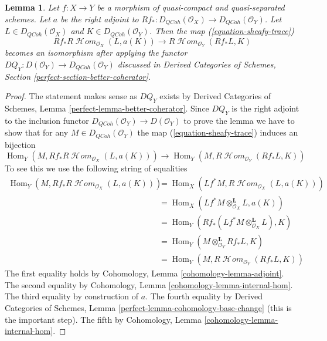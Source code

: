 \documentclass[10pt,a4paper]{amsart}
\theoremstyle{plain}
\newtheorem{lemma}[subsection]{Lemma}
\theoremstyle{definition}
\theoremstyle{remark}
\numberwithin{equation}{subsection}
\def\Hom{\mathop{\mathrm{Hom}}\nolimits}
\def\SheafHom{\mathop{\mathcal{H}\!\mathit{om}}\nolimits}
\def\QCoh{\mathit{QCoh}}
\begin{document}
\begin{lemma}
\label{lemma-iso-on-RSheafHom}
Let $f : X \to Y$ be a morphism of quasi-compact and quasi-separated schemes.
Let $a$ be the right adjoint to
$Rf_* : D_\QCoh(\mathcal{O}_X) \to D_\QCoh(\mathcal{O}_Y)$.
Let $L \in D_\QCoh(\mathcal{O}_X)$ and $K \in D_\QCoh(\mathcal{O}_Y)$.
Then the map (\ref{equation-sheafy-trace})
$$
Rf_*R\SheafHom_{\mathcal{O}_X}(L, a(K))
\longrightarrow
R\SheafHom_{\mathcal{O}_Y}(Rf_*L, K)
$$
becomes an isomorphism after applying the functor
$DQ_Y : D(\mathcal{O}_Y) \to D_\QCoh(\mathcal{O}_Y)$
discussed in Derived Categories of Schemes, Section
\ref{perfect-section-better-coherator}.
\end{lemma}

\begin{proof}
The statement makes sense as $DQ_Y$ exists by
Derived Categories of Schemes, Lemma \ref{perfect-lemma-better-coherator}.
Since $DQ_Y$ is the right adjoint to the inclusion
functor $D_\QCoh(\mathcal{O}_Y) \to D(\mathcal{O}_Y)$
to prove the lemma we have to show that for any $M \in D_\QCoh(\mathcal{O}_Y)$
the map (\ref{equation-sheafy-trace}) induces an bijection
$$
\Hom_Y(M, Rf_*R\SheafHom_{\mathcal{O}_X}(L, a(K)))
\longrightarrow
\Hom_Y(M, R\SheafHom_{\mathcal{O}_Y}(Rf_*L, K))
$$
To see this we use the following string of equalities
\begin{align*}
\Hom_Y(M, Rf_*R\SheafHom_{\mathcal{O}_X}(L, a(K)))
& =
\Hom_X(Lf^*M, R\SheafHom_{\mathcal{O}_X}(L, a(K))) \\
& =
\Hom_X(Lf^*M \otimes_{\mathcal{O}_X}^\mathbf{L} L, a(K)) \\
& =
\Hom_Y(Rf_*(Lf^*M \otimes_{\mathcal{O}_X}^\mathbf{L} L), K) \\
& =
\Hom_Y(M \otimes_{\mathcal{O}_Y}^\mathbf{L} Rf_*L, K) \\
& =
\Hom_Y(M, R\SheafHom_{\mathcal{O}_Y}(Rf_*L, K))
\end{align*}
The first equality holds by Cohomology, Lemma \ref{cohomology-lemma-adjoint}.
The second equality by Cohomology, Lemma \ref{cohomology-lemma-internal-hom}.
The third equality by construction of $a$.
The fourth equality by Derived Categories of Schemes, Lemma
\ref{perfect-lemma-cohomology-base-change} (this is the important step).
The fifth by Cohomology, Lemma \ref{cohomology-lemma-internal-hom}.
\end{proof}
\end{document}
